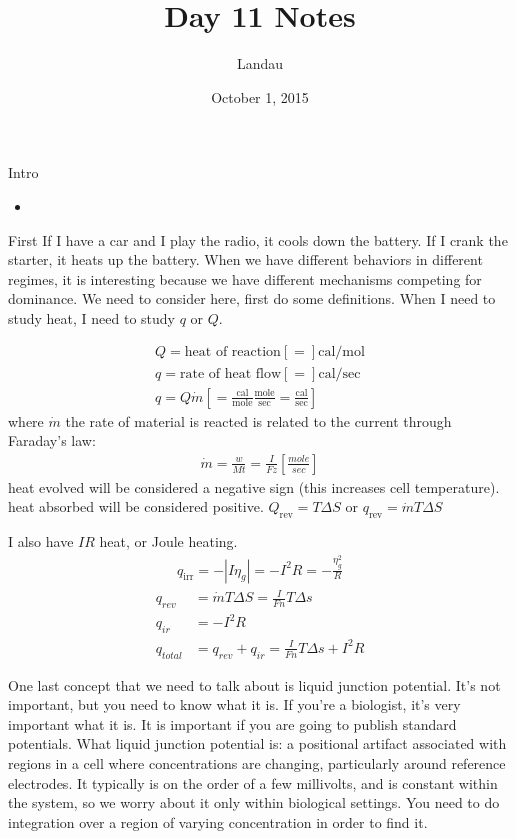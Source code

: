\documentclass{article}
\author{Landau}
\title{Day 11 Notes}
\date{October 1, 2015}
\newcommand{\mdot}[0]{\dot{m}}
\begin{document}
\maketitle{}
\begin{section}{Intro}
	\begin{itemize}
		\item 	
	\end{itemize}
\end{section}
\begin{section}{First}
	If I have a car and I play the radio, it cools down the battery. If I crank the starter, it heats up the battery. When we have different behaviors in different regimes, it is interesting because we have different mechanisms competing for dominance. We need to consider here, first do some definitions. When I need to study heat, I need to study $q$ or $Q$.

	\begin{align*}
		Q =\text{heat of reaction}[=]\text{cal/mol}\\
		q =\text{rate of heat flow}[=]\text{cal/sec}\\
		q = Q\dot{m}\left[=\frac{\text{cal}}{\text{mole}}\frac{\text{mole}}{\text{sec}}=\frac{\text{cal}}{\text{sec}}\right]
	\end{align*}
	where $\dot{m}$ the rate of material is reacted is related to the current through Faraday's law:
	\begin{align*}
		\mdot = \frac{w}{Mt} = \frac{I}{Fz}\left[\frac{mole}{sec}\right]
	\end{align*}
	heat evolved will be considered a negative sign (this increases cell temperature).
	heat absorbed will be considered positive.
	$Q_\text{rev} = T\Delta S$ or $q_\text{rev} = \mdot T\Delta S$

	I also have $IR$ heat, or Joule heating. 
	\begin{align*}
		q_\text{irr} = -\left|I\eta_g\right|=- I^2R =- \frac{\eta_g^2}{R}
	\end{align*}
	\begin{align*}
		q_{rev} &= \mdot T\Delta S = \frac{I}{Fn}T\Delta s\\
		q_{ir} &= - I^2 R\\
		q_{total} &= q_{rev} + q_{ir} = \frac{I}{Fn}T\Delta s+I^2 R
	\end{align*}

	One last concept that we need to talk about is liquid junction potential. 
	It's not important, but you need to know what it is. If you're a biologist, it's very important what it is. It is important if you are going to publish standard potentials. What liquid junction potential is:
	a positional artifact associated with regions in a cell where concentrations are changing, particularly around reference electrodes. It typically is on the order of a few millivolts, and is constant within the system, so we worry about it only within biological settings. You need to do integration over a region of varying concentration in order to find it.


\end{section}
\end{document}

